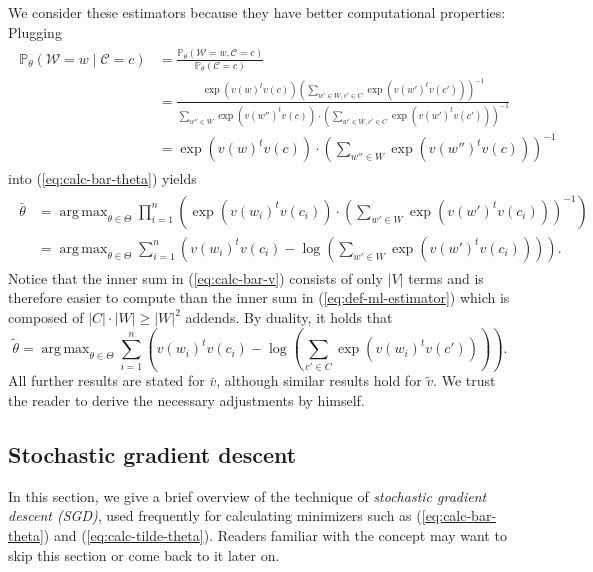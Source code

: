\documentclass{amsart}
\theoremstyle{plain}
\theoremstyle{definition}
\renewcommand{\P}{\mathbb{P}}
\DeclareMathOperator*{\argmax}{arg\,max}
\begin{document}
We consider these estimators because they have better computational properties:
Plugging
\begin{align}
  \label{eq:conditional-probability}
  \begin{split}
    \P_\theta(\mathcal{W} = w \mid \mathcal{C} = c) & = \frac{\P_\theta(\mathcal{W} = w, \mathcal{C} = c)}{\P_\theta(\mathcal{C} = c)} \\
                                                    & = \frac{\exp(v(w)^t v(c)) \left( \sum\limits_{w' \in W, c' \in C} \exp(v(w')^t v(c')) \right)^{-1}}{\sum\limits_{w'' \in W} \exp(v(w'')^t v(c)) \cdot \left( \sum\limits_{w' \in W, c' \in C} \exp(v(w')^t v(c')) \right)^{-1}} \\
                                                    & = \exp(v(w)^t v(c)) \cdot \left( \sum\limits_{w'' \in W} \exp(v(w'')^t v(c)) \right)^{-1}
  \end{split}
\end{align}
into (\ref{eq:calc-bar-theta}) yields
\begin{align}
  \label{eq:calc-bar-theta}
  \begin{split}
    \bar \theta & = \argmax_{\theta \in \Theta} \prod_{i = 1}^n \left(\exp(v(w_i)^t v(c_i)) \cdot \left( \sum\limits_{w' \in W} \exp(v(w')^t v(c_i)) \right)^{-1} \right) \\
                & = \argmax_{\theta \in \Theta} \sum_{i = 1}^n \left(v(w_i)^t v(c_i) - \log \left( \sum\limits_{w' \in W} \exp(v(w')^t v(c_i)) \right) \right).
  \end{split}
\end{align}
Notice that the inner sum in (\ref{eq:calc-bar-v}) consists of only $|V|$ terms and is therefore easier to compute than the inner sum in (\ref{eq:def-ml-estimator}) which is composed of $|C| \cdot |W| \geq |W|^2$ addends.
By duality, it holds that
\begin{equation}
  \label{eq:calc-tilde-theta}
  \tilde \theta = \argmax_{\theta \in \Theta} \sum_{i = 1}^n \left(v(w_i)^t v(c_i) - \log \left( \sum\limits_{c' \in C} \exp(v(w_i)^t v(c')) \right) \right).
\end{equation}
All further results are stated for $\bar v$, although similar results hold for $\tilde v$.
We trust the reader to derive the necessary adjustments by himself.

\subsection{Stochastic gradient descent}
In this section, we give a brief overview of the technique of \emph{stochastic gradient descent (SGD)}, used frequently for calculating minimizers such as (\ref{eq:calc-bar-theta}) and (\ref{eq:calc-tilde-theta}).
Readers familiar with the concept may want to skip this section or come back to it later on.
\end{document}

